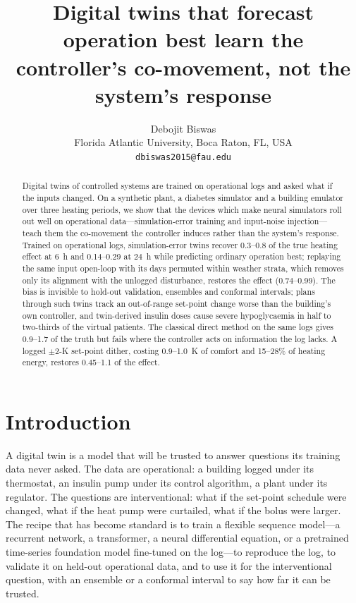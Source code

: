 \documentclass[11pt]{article}
\title{Digital twins that forecast operation best learn the controller's co-movement, not the system's response}
\author{Debojit Biswas\\[2pt]\small Florida Atlantic University, Boca Raton, FL, USA\\\small \texttt{dbiswas2015@fau.edu}}
\date{}
\begin{document}
\maketitle

\begin{abstract}
Digital twins of controlled systems are trained on operational logs and asked what if the inputs changed. On a synthetic plant, a diabetes simulator and a building emulator over three heating periods, we show that the devices which make neural simulators roll out well on operational data---simulation-error training and input-noise injection---teach them the co-movement the controller induces rather than the system's response. Trained on operational logs, simulation-error twins recover 0.3--0.8 of the true heating effect at 6~h and 0.14--0.29 at 24~h while predicting ordinary operation best; replaying the same input open-loop with its days permuted within weather strata, which removes only its alignment with the unlogged disturbance, restores the effect (0.74--0.99). The bias is invisible to hold-out validation, ensembles and conformal intervals; plans through such twins track an out-of-range set-point change worse than the building's own controller, and twin-derived insulin doses cause severe hypoglycaemia in half to two-thirds of the virtual patients. The classical direct method on the same logs gives 0.9--1.7 of the truth but fails where the controller acts on information the log lacks. A logged $\pm2$-K set-point dither, costing 0.9--1.0~K of comfort and 15--28\% of heating energy, restores 0.45--1.1 of the effect.
\end{abstract}

\section*{Introduction}
A digital twin is a model that will be trusted to answer questions its training data never asked. The data are operational: a building logged under its thermostat, an insulin pump under its control algorithm, a plant under its regulator. The questions are interventional: what if the set-point schedule were changed, what if the heat pump were curtailed, what if the bolus were larger. The recipe that has become standard is to train a flexible sequence model---a recurrent network, a transformer, a neural differential equation, or a pretrained time-series foundation model fine-tuned on the log---to reproduce the log, to validate it on held-out operational data, and to use it for the interventional question, with an ensemble or a conformal interval to say how far it can be trusted.
\end{document}
